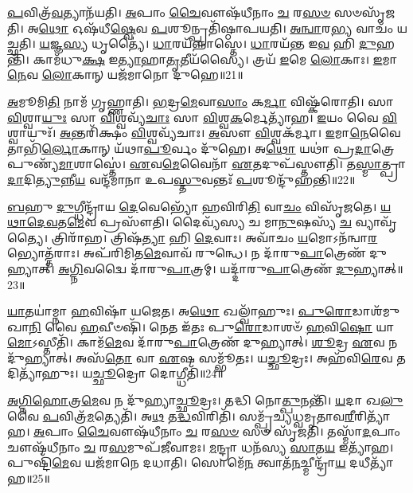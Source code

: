 \-\ul{𑌪}\-𑌵𑌿𑌤𑍍𑌰᳴\-\ul{𑌵}\-𑌤𑍍𑌯𑌾𑌨᳴𑌯𑌤𑌿।
\-\ul{𑌅}\-𑌪𑌾𑌂 \ul{𑌚𑍈}\-𑌵𑍗𑌷᳴𑌧𑍀𑌨𑌾𑌂 \ul{𑌚} 𑌰\-\ul{𑌸}\-\-\ul{𑍞} 𑌸𑍞𑌸𑍃᳴𑌜𑌤𑌿।
𑌅\-\ul{𑌥𑍋} 𑌓𑌷᳴𑌧𑍀\-\ul{𑌷𑍍𑌵𑍇}\-𑌵 \ul{𑌪}\-𑌶𑍂𑌨𑍍𑌪𑍍𑌰𑌤𑌿᳴\-𑌷𑍍𑌠𑌾𑌪𑌯𑌤𑌿।
\-\ul{𑌅}\-\-\ul{𑌨𑍍𑌵𑌾}\-𑌰\-\ul{𑌭𑍍𑌯} 𑌵𑌾𑌚𑌂᳴ 𑌯𑌚𑍍𑌛𑌤𑌿।
\-\ul{𑌯}\-𑌜𑍍𑌞\-\ul{𑌸𑍍𑌯} 𑌧𑍃𑌤𑍍𑌯𑍈॑।
\-\ul{𑌧𑌾}\-𑌰𑌯᳴𑌨𑍍𑌨𑌾𑌸𑍍𑌤𑍇।
\-\ul{𑌧𑌾}\-𑌰𑌯᳴𑌨𑍍𑌤 𑌇\-\ul{𑌵} 𑌹𑌿 \ul{𑌦𑍁}\-𑌹𑌨𑍍𑌤𑌿᳴।
𑌕𑌾𑌮᳴𑌧𑍁\-\ul{𑌕𑍍𑌷} 𑌇\-\ul{𑌤𑍍𑌯𑌾}\-𑌹𑌾\-\ul{𑌤𑍃}\-𑌤𑍀𑌯᳴𑌸𑍍𑌯𑍈।
𑌤𑍍𑌰𑌯᳴ \ul{𑌇}\-𑌮𑍇 \ul{𑌲𑍋}\-𑌕𑌾𑌃।
\-\ul{𑌇}\-𑌮𑌾\-\ul{𑌨𑍇}\-𑌵 \ul{𑌲𑍋}\-𑌕𑌾𑌨𑍍 ‌𑌯𑌜᳴𑌮𑌾𑌨𑍋 𑌦𑍁𑌹𑍇॥21॥

\-\ul{𑌅}\-𑌮𑍂𑌮𑌿\-\ul{𑌤𑌿} 𑌨𑌾𑌮᳴ 𑌗𑍃𑌹𑍍𑌣𑌾𑌤𑌿।
\-\ul{𑌭}\-𑌦𑍍𑌰\-\ul{𑌮𑍇}\-𑌵𑌾\-\ul{𑌸𑌾𑌂} 𑌕\-\ul{𑌰𑍍𑌮𑌾} 𑌵𑌿𑌷𑍍𑌕᳴𑌰𑍋𑌤𑌿।
𑌸𑌾 \ul{𑌵𑌿}\-𑌶𑍍𑌵𑌾\-\ul{𑌯𑍁𑌃} 𑌸𑌾 \ul{𑌵𑌿}\-𑌶𑍍𑌵𑌵𑍍𑌯᳴\-\ul{𑌚𑌾𑌃} 𑌸𑌾 \ul{𑌵𑌿}\-𑌶𑍍𑌵\-\ul{𑌕}\-𑌰𑍍𑌮𑍇𑌤𑍍𑌯𑌾᳴𑌹।
\-\ul{𑌇}\-𑌯𑌂 𑌵𑍈 \ul{𑌵𑌿}\-𑌶𑍍𑌵𑌾𑌯𑍁𑌃᳴।
\-\ul{𑌅}\-𑌨𑍍𑌤𑌰𑌿᳴𑌕𑍍𑌷𑌂 \ul{𑌵𑌿}\-𑌶𑍍𑌵𑌵𑍍𑌯᳴𑌚𑌾𑌃।
\-\ul{𑌅}\-𑌸𑍗 \ul{𑌵𑌿}\-𑌶𑍍𑌵𑌕᳴𑌰𑍍𑌮𑌾।
\-\ul{𑌇}\-𑌮𑌾\-\ul{𑌨𑍇}\-𑌵𑍈𑌤𑌾𑌭𑌿᳴\-\ul{𑌰𑍍𑌲𑍋}\-𑌕𑌾𑌨𑍍‌ 𑌯᳴𑌥𑌾\-\ul{𑌪𑍂}\-𑌰𑍍𑌵𑌂 𑌦𑍁᳴𑌹𑍇।
𑌅\-\ul{𑌥𑍋} 𑌯𑌥𑌾॑ 𑌪𑍍𑌰\-\ul{𑌦𑌾}\-𑌤𑍍𑌰𑍇 𑌪𑍁𑌣𑍍𑌯᳴\-\ul{𑌮𑌾}\-𑌶𑌾𑌸𑍍𑌤𑍇॑।
\-\ul{𑌏}\-𑌵\-\ul{𑌮𑍇}\-𑌵𑍈𑌨𑌾᳴ \ul{𑌏}\-𑌤𑌦𑍁𑌪᳴𑌸𑍍𑌤𑍗𑌤𑌿।
𑌤\-\ul{𑌸𑍍𑌮𑌾}\-𑌤𑍍𑌪𑍍𑌰𑌾\-\ul{𑌦𑌾}\-𑌦𑌿\-\ul{𑌤𑍍𑌯𑍁}\-𑌨𑍍𑌨𑍀\-\ul{𑌯} 𑌵𑌨𑍍𑌦᳴𑌮𑌾𑌨𑌾 𑌉𑌪\-\ul{𑌸𑍍𑌤𑍁}\-𑌵𑌨𑍍𑌤𑌃᳴ \ul{𑌪}\-𑌶𑍂𑌨𑍍𑌦𑍁᳴\-𑌹𑌨𑍍𑌤𑌿॥22॥

\-\ul{𑌬}\-𑌹𑍁 \ul{𑌦𑍁}\-𑌗𑍍𑌧𑍀𑌨𑍍𑌦𑍍𑌰𑌾᳴𑌯 \ul{𑌦𑍇}\-𑌵𑍇𑌭𑍍𑌯𑍋᳴ \ul{𑌹}\-𑌵𑌿𑌰𑌿\-\ul{𑌤𑌿} 𑌵𑌾\-\ul{𑌚𑌂} 𑌵𑌿𑌸𑍃᳴𑌜𑌤𑍇।
\-\ul{𑌯}\-\-\ul{𑌥𑌾}\-\-\ul{𑌦𑍇}\-\-\ul{𑌵}\-𑌤\-\ul{𑌮𑍇}\-𑌵 𑌪𑍍𑌰𑌸𑍗᳴𑌤𑌿।
𑌦𑍈𑌵𑍍𑌯᳴𑌸𑍍𑌯 𑌚 𑌮𑌾\-\ul{𑌨𑍁}\-𑌷𑌸𑍍𑌯᳴ \ul{𑌚} 𑌵𑍍𑌯𑌾𑌵𑍃᳴𑌤𑍍𑌯𑍈।
𑌤𑍍𑌰𑌿𑌰𑌾᳴𑌹।
𑌤𑍍𑌰𑌿𑌷᳴\-\ul{𑌤𑍍𑌯𑌾} 𑌹𑌿 \ul{𑌦𑍇}\-𑌵𑌾𑌃।
𑌅𑌵𑌾᳴𑌚𑌂 \ul{𑌯}\-𑌮𑍋\-𑌽𑌨᳴𑌨𑍍𑌵𑌾\-\ul{𑌰}\-𑌭𑍍𑌯𑍋𑌤𑍍𑌤᳴𑌰𑌾𑌃।
𑌅𑌪᳴𑌰𑌿𑌮𑌿𑌤\-\ul{𑌮𑍇}\-𑌵𑌾𑌵᳴ 𑌰𑍁𑌨𑍍𑌧𑍇।
𑌨 𑌦𑌾᳴𑌰𑍁\-\ul{𑌪𑌾}\-𑌤𑍍𑌰𑍇𑌣᳴ 𑌦𑍁𑌹𑍍𑌯𑌾𑌤𑍍।
\-\ul{𑌅}\-\-\ul{𑌗𑍍𑌨𑌿}\-𑌵𑌦𑍍𑌵𑍈 𑌦𑌾᳴𑌰𑍁\-\ul{𑌪𑌾}\-𑌤𑍍𑌰𑌮𑍍।
𑌯𑌦𑍍𑌦𑌾᳴𑌰𑍁\-\ul{𑌪𑌾}\-𑌤𑍍𑌰𑍇𑌣᳴ \ul{𑌦𑍁}\-𑌹𑍍𑌯𑌾𑌤𑍍॥23॥

\-\ul{𑌯𑌾}\-𑌤𑌯𑌾॑𑌮𑍍𑌨𑌾 \ul{𑌹}\-𑌵𑌿𑌷𑌾᳴ 𑌯𑌜𑍇𑌤।
𑌅\-\ul{𑌥𑍋} 𑌖𑌲𑍍𑌵𑌾᳴𑌹𑍁𑌃।
\-\ul{𑌪𑍁}\-\-\ul{𑌰𑍋}\-𑌡𑌾𑌶᳴𑌮𑍁𑌖𑌾\-\ul{𑌨𑌿} 𑌵𑍈 \ul{𑌹}\-𑌵𑍀𑍞𑌷𑌿᳴।
𑌨𑍇𑌤 𑌇᳴𑌤𑌃 𑌪𑍁\-\ul{𑌰𑍋}\-𑌡𑌾𑌶𑍞᳴ \ul{𑌹}\-𑌵𑌿\-\ul{𑌷𑍋} 𑌯𑌾\-\ul{𑌮𑍋}\-\-𑌽𑌸𑍍𑌤𑍀𑌤𑌿᳴।
𑌕𑌾𑌮᳴\-\ul{𑌮𑍇}\-𑌵 𑌦𑌾᳴𑌰𑍁\-\ul{𑌪𑌾}\-𑌤𑍍𑌰𑍇𑌣᳴ 𑌦𑍁𑌹𑍍𑌯𑌾𑌤𑍍।
\-\ul{𑌶𑍂}\-𑌦𑍍𑌰 \ul{𑌏}\-𑌵 𑌨 𑌦𑍁᳴𑌹𑍍𑌯𑌾𑌤𑍍।
𑌅𑌸᳴\-\ul{𑌤𑍋} 𑌵𑌾 \ul{𑌏}\-𑌷 𑌸𑌮𑍍𑌭𑍂᳴𑌤𑌃।
𑌯\-\ul{𑌚𑍍𑌛𑍂}\-𑌦𑍍𑌰𑌃।
𑌅𑌹᳴𑌵𑌿\-\ul{𑌰𑍇}\-𑌵 𑌤𑌦𑌿𑌤𑍍𑌯𑌾᳴𑌹𑍁𑌃।
𑌯\-\ul{𑌚𑍍𑌛𑍂}\-𑌦𑍍𑌰𑍋 𑌦𑍋𑌗𑍍𑌧𑍀𑌤𑌿᳴॥24॥

\-\ul{𑌅}\-\-\ul{𑌗𑍍𑌨𑌿}\-\-\ul{𑌹𑍋}\-𑌤𑍍𑌰\-\ul{𑌮𑍇}\-𑌵 𑌨 𑌦𑍁᳴𑌹𑍍𑌯𑌾\-\ul{𑌚𑍍𑌛𑍂}\-𑌦𑍍𑌰𑌃।
𑌤𑌦𑍍𑌧𑌿 𑌨𑍋\-\ul{𑌤𑍍𑌪𑍁}\-𑌨𑌨𑍍𑌤𑌿᳴।
\-\ul{𑌯}\-𑌦𑌾 𑌖\-\ul{𑌲𑍁} 𑌵𑍈 \ul{𑌪}\-𑌵𑌿𑌤𑍍𑌰᳴\-\ul{𑌮}\-𑌤𑍍𑌯𑍇𑌤𑌿᳴।
𑌅\-\ul{𑌥} 𑌤\-\ul{𑌦𑍍𑌧}\-𑌵𑌿𑌰𑌿𑌤𑌿᳴।
𑌸𑌮𑍍𑌪𑍃᳴𑌚𑍍𑌯𑌧𑍍𑌵𑌮𑍃𑌤𑌾𑌵\-\ul{𑌰𑍀}\-𑌰𑌿𑌤𑍍𑌯𑌾᳴𑌹।
\-\ul{𑌅}\-𑌪𑌾𑌂 \ul{𑌚𑍈}\-𑌵𑍗𑌷᳴𑌧𑍀𑌨𑌾𑌂 \ul{𑌚} 𑌰\-\ul{𑌸}\-\-\ul{𑍞} 𑌸𑍞 𑌸𑍃᳴𑌜𑌤𑌿।
𑌤𑌸𑍍𑌮𑌾᳴\-\ul{𑌦}\-𑌪𑌾𑌂 𑌚𑍗𑌷᳴𑌧𑍀𑌨𑌾𑌂 \ul{𑌚} 𑌰\-\ul{𑌸}\-𑌮𑍁𑌪᳴𑌜𑍀𑌵𑌾𑌮𑌃।
\-\ul{𑌮}\-𑌨𑍍𑌦𑍍𑌰𑌾 𑌧𑌨᳴𑌸𑍍𑌯 \ul{𑌸𑌾}\-𑌤\-\ul{𑌯} 𑌇𑌤𑍍𑌯𑌾᳴𑌹।
𑌪𑍁𑌷𑍍𑌟𑌿᳴\-\ul{𑌮𑍇}\-𑌵 𑌯𑌜᳴𑌮𑌾𑌨𑍇 𑌦𑌧𑌾𑌤𑌿।
𑌸𑍋𑌮𑍇᳴\-\ul{𑌨} 𑌤𑍍𑌵𑌾𑌤᳴\-\ul{𑌨}\-𑌚𑍍𑌮𑍀𑌨𑍍𑌦𑍍𑌰𑌾᳴\-\ul{𑌯} 𑌦𑌧𑍀𑌤𑍍𑌯𑌾᳴𑌹॥25॥


